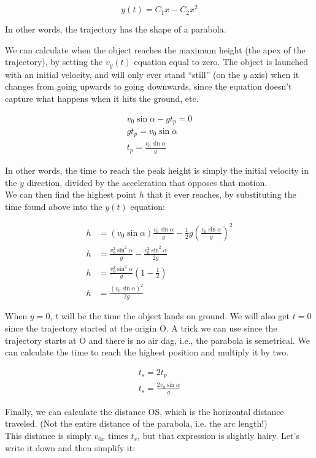 \begin{equation}
y(t) = C_1 x - C_2 x^2
\end{equation}

In other words, the trajectory has the shape of a parabola.

We can calculate when the object reaches the maximum height (the apex of the trajectory), by setting the $v_y(t)$ equation equal to zero. The object is launched with an initial velocity, and will only ever stand ``still'' (on the $y$ axis) when it changes from going upwards to going downwards, since the equation doesn't capture what happens when it hits the ground, etc.

\begin{align}
v_0 \sin \alpha - g t_p = 0\\
g t_p = v_0 \sin \alpha\\
t_p = \frac{v_0 \sin \alpha}{g}
\end{align}

In other words, the time to reach the peak height is simply the initial velocity in the $y$ direction, divided by the acceleration that opposes that motion.\\
We can then find the highest point $h$ that it ever reaches, by substituting the time found above into the $y(t)$ equation:

\begin{align}
h &= (v_0 \sin \alpha) \frac{v_0 \sin \alpha}{g} - \frac{1}{2} g \left(\frac{v_0 \sin \alpha}{g}\right)^2\\
h &= \frac{v_0^2 \sin^2 \alpha}{g} - \frac{v_0^2 \sin^2 \alpha}{2g}\\
h &= \frac{v_0^2 \sin^2 \alpha}{g} \left(1 - \frac{1}{2}\right)\\
h &= \frac{(v_0 \sin \alpha)^2}{2g}\label{eq:lec3_height}
\end{align}

When $y=0$, $t$ will be the time the object lands on ground. We will also get $t=0$ since the trajectory
started at the origin O. A trick we can use since the trajectory starts at O and there is no air dag,
i.e., the parabola is semetrical. We can calculate the time to reach the highest position and multiply it by two.

\begin{align}
t_s = 2 t_p\\
t_s = \frac{2 v_0 \sin \alpha}{g}
\end{align}

Finally, we can calculate the distance OS, which is the horizontal distance traveled. (Not the entire distance of the parabola, i.e. the arc length!)\\
This distance is simply $v_{0x}$ times $t_s$, but that expression is slightly hairy. Let's write it down and then simplify it:

